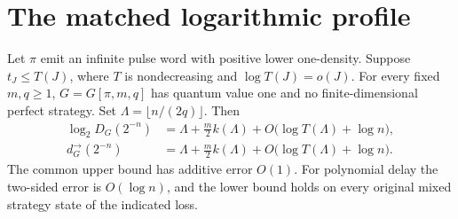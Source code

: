 \section{The matched logarithmic profile}\label{sec:profile-law}
\begin{theorem}\label{thm:profile-law}
Let $\pi$ emit an infinite pulse word with positive lower one-density. Suppose $t_J\le T(J)$, where $T$ is nondecreasing and $\log T(J)=o(J)$. For every fixed $m,q\ge1$, $G=G[\pi,m,q]$ has quantum value one and no finite-dimensional perfect strategy. Set $\Lambda=\lfloor n/(2q)\rfloor$. Then
\begin{align}
 \log_2D_G(2^{-n})&=\Lambda+\tfrac m2k(\Lambda)
   +O\bigl(\log T(\Lambda)+\log n\bigr),\label{eq:profile-dimension}\\
 d_G^\to(2^{-n})&=\Lambda+\tfrac m2k(\Lambda)
   +O\bigl(\log T(\Lambda)+\log n\bigr).\label{eq:profile-usable}
\end{align}
The common upper bound has additive error $O(1)$. For polynomial delay the two-sided error is $O(\log n)$, and the lower bound holds on every original mixed strategy state of the indicated loss.
\end{theorem}
